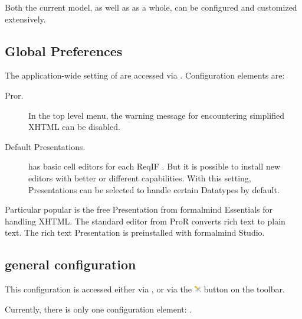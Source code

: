 Both the current model, as well as \pror{} as a whole, can be configured and customized extensively.

\subsection{Global Preferences}

The application-wide setting of \pror{} are accessed via .  Configuration elements are:

\begin{description}
\item[Pror.] In the top level menu, the warning message for encountering simplified XHTML can be disabled.
\item[Default Presentations.] \pror{} has basic cell editors for each ReqIF .  But it is possible to install new editors with better or different capabilities.  With this setting, Presentations can be selected to handle certain Datatypes by default.
\end{description}

\begin{info}
Particular popular is the free Presentation from formalmind Essentials for handling XHTML.  The standard editor from ProR converts rich text to plain text.  The rich text Presentation is preinstalled with formalmind Studio.
\end{info}

\subsection{general configuration}
\label{sec:general_configuration}

This configuration is accessed either via , or
via the \includegraphics[height=0.8em]{../rmf-images/ReqIFUIToolExtension.png} button on the toolbar.

Currently, there is only one configuration element: .


